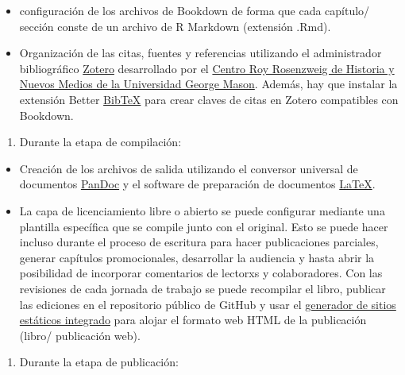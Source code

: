 \documentclass[
]{book}
\providecommand{\tightlist}{%
  \setlength{\itemsep}{0pt}\setlength{\parskip}{0pt}}
\begin{document}
\begin{itemize}
\item
  configuración de los archivos de Bookdown de forma que cada capítulo/ sección conste de un archivo de R Markdown (extensión .Rmd).
\item
  Organización de las citas, fuentes y referencias utilizando el administrador bibliográfico \href{https://zotero.org/}{Zotero} desarrollado por el \href{https://rrchnm.org/}{Centro Roy Rosenzweig de Historia y Nuevos Medios de la Universidad George Mason}. Además, hay que instalar la extensión Better \href{https://github.com/retorquere/zotero-better-bibtex}{BibTeX} para crear claves de citas en Zotero compatibles con Bookdown.
\end{itemize}

\begin{enumerate}
\def\labelenumi{\arabic{enumi}.}
\setcounter{enumi}{1}
\tightlist
\item
  Durante la etapa de compilación:
\end{enumerate}

\begin{itemize}
\item
  Creación de los archivos de salida utilizando el conversor universal de documentos \href{https://pandoc.org/}{PanDoc} y el software de preparación de documentos \href{https://www.latex-project.org/}{LaTeX}.
\item
  La capa de licenciamiento libre o abierto se puede configurar mediante una plantilla específica que se compile junto con el original. Esto se puede hacer incluso durante el proceso de escritura para hacer publicaciones parciales, generar capítulos promocionales, desarrollar la audiencia y hasta abrir la posibilidad de incorporar comentarios de lectorxs y colaboradores. Con las revisiones de cada jornada de trabajo se puede recompilar el libro, publicar las ediciones en el repositorio público de GitHub y usar el \href{https://pages.github.com/}{generador de sitios estáticos integrado} para alojar el formato web HTML de la publicación (libro/ publicación web).
\end{itemize}

\begin{enumerate}
\def\labelenumi{\arabic{enumi}.}
\setcounter{enumi}{2}
\tightlist
\item
  Durante la etapa de publicación:
\end{enumerate}
\end{document}
